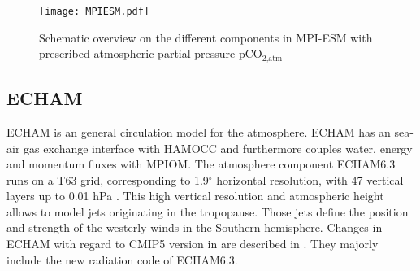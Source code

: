 \begin{figure}[h!]
	\centering 
	\texttt{[image: MPIESM.pdf]}
	\caption{Schematic overview on the different components in \ac{MPI-ESM} with prescribed atmospheric partial pressure pCO$_{\text{2,atm}}$ \citep{Giorgetta2013}}
	\label{fig:MPIESM}
\end{figure}



\subsection{ECHAM}
\acs{ECHAM} is an general circulation model for the atmosphere. \acs{ECHAM} has an sea-air gas exchange interface with \acs{HAMOCC} and furthermore couples water, energy and momentum fluxes with \acs{MPIOM}. 
The atmosphere component \acs{ECHAM}6.3 runs on a T63 grid, corresponding to 1.9$^\circ$ horizontal resolution, with 47 vertical layers up to 0.01 hPa \citep{Stevens2013}. 
This high vertical resolution and atmospheric height allows to model jets originating in the tropopause. Those jets define the position and strength of the westerly winds in the Southern hemisphere. %
Changes in \acs{ECHAM} with regard to \acs{CMIP5} version in \cite{Stevens2013} are described in \cite{Bittner2016}. They majorly include the new radiation code of \acs{ECHAM}6.3.%


